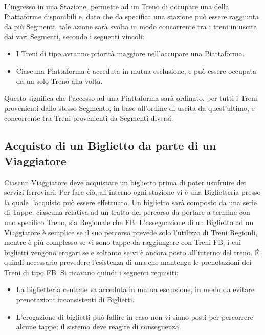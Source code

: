 	L'ingresso in una Stazione, permette ad un Treno di occupare una della Piattaforme disponibili e, dato che da specifica una stazione può essere raggiunta da più Segmenti, tale azione sarà svolta in modo concorrente tra i treni in uscita dai vari Segmenti, secondo i seguenti vincoli:
		\begin{itemize}
			\item I Treni di tipo  avranno priorità maggiore nell'occupare una Piattaforma.
			\item Ciascuna Piattaforma è acceduta in mutua esclusione, e può essere occupata da un solo Treno alla volta.  
		\end{itemize}

	Questo significa che l'accesso ad una Piattaforma sarà ordinato, per tutti i Treni provenienti dallo stesso Segmento, in base all'ordine di uscita da quest'ultimo, e concorrente tra Treni provenienti da Segmenti diversi. 

	\subsection{Acquisto di un Biglietto da parte di un Viaggiatore}

	Ciascun Viaggiatore deve acquistare un biglietto prima di poter usufruire dei servizi ferroviari. Per fare ciò, all'interno ogni stazione vi è una Biglietteria presso la quale l'acquisto può essere effettuato. Un biglietto sarà composto da una serie di Tappe, ciascuna relativa ad un tratto del percorso da portare a termine con uno specifico Treno, sia Regionale che FB. 
	L'assegnazione di un Biglietto ad un Viaggiatore è semplice se il suo percorso prevede solo l'utilizzo di Treni Regionli, mentre è più complesso se vi sono tappe da raggiungere con Treni FB, i cui biglietti vengono erogari se e soltanto se vi è ancora posto all'interno del treno.
	\'E quindi necessario prevedere l'esistenza di una  che mantenga le prenotazioni dei Treni di tipo FB. Si ricavano quindi i seguenti requisiti:
		\begin{itemize}
			\item La biglietteria centrale va acceduta in mutua esclusione, in modo da evitare prenotazioni inconsistenti di Biglietti.
			\item L'erogazione di biglietti può fallire in caso non vi siano posti per percorrere alcune tappe; il sistema deve reagire di conseguenza.
		\end{itemize}
